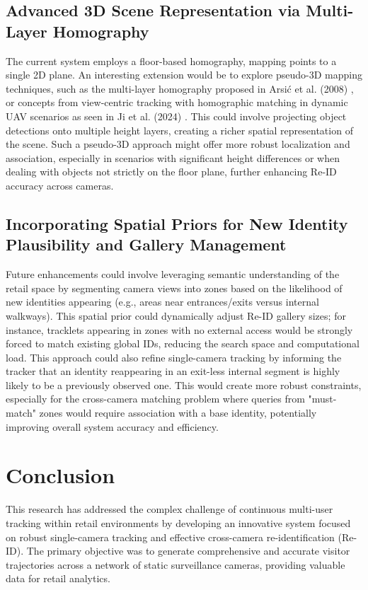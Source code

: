 \documentclass[12pt, a4paper]{article}
\begin{document}
\subsection{Advanced 3D Scene Representation via Multi-Layer Homography}

The current system employs a floor-based homography, mapping points to a single 2D plane. An interesting extension would be to explore pseudo-3D mapping techniques, such as the multi-layer homography proposed in Arsić et al. (2008)\cite{multi-layer-homography} , or concepts from view-centric tracking with homographic matching in dynamic UAV scenarios as seen in Ji et al. (2024) \cite{Homography-UAV} . This could involve projecting object detections onto multiple height layers, creating a richer spatial representation of the scene. Such a pseudo-3D approach might offer more robust localization and association, especially in scenarios with significant height differences or when dealing with objects not strictly on the floor plane, further enhancing Re-ID accuracy across cameras.


\subsection{Incorporating Spatial Priors for New Identity Plausibility and Gallery Management}

Future enhancements could involve leveraging semantic understanding of the retail space by segmenting camera views into zones based on the likelihood of new identities appearing (e.g., areas near entrances/exits versus internal walkways). This spatial prior could dynamically adjust Re-ID gallery sizes; for instance, tracklets appearing in zones with no external access would be strongly forced to match existing global IDs, reducing the search space and computational load. This approach could also refine single-camera tracking by informing the tracker that an identity reappearing in an exit-less internal segment is highly likely to be a previously observed one. This would create more robust constraints, especially for the cross-camera matching problem where queries from "must-match" zones would require association with a base identity, potentially improving overall system accuracy and efficiency.


\section{Conclusion}

This research has addressed the complex challenge of continuous multi-user tracking within retail environments by developing an innovative system focused on robust single-camera tracking and effective cross-camera re-identification (Re-ID). The primary objective was to generate comprehensive and accurate visitor trajectories across a network of static surveillance cameras, providing valuable data for retail analytics.
\end{document}
